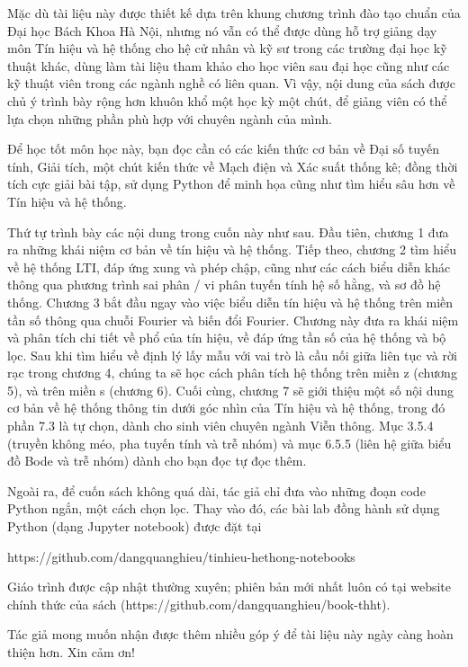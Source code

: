 \documentclass[
  10
]{article}
\begin{document}
Mặc dù tài liệu này được thiết kế dựa trên khung chương trình đào tạo
chuẩn của Đại học Bách Khoa Hà Nội, nhưng nó vẫn có thể được dùng hỗ trợ
giảng dạy môn Tín hiệu và hệ thống cho hệ cử nhân và kỹ sư trong các
trường đại học kỹ thuật khác, dùng làm tài liệu tham khảo cho học viên
sau đại học cũng như các kỹ thuật viên trong các ngành nghề có liên
quan. Vì vậy, nội dung của sách được chủ ý trình bày rộng hơn khuôn khổ
một học kỳ một chút, để giảng viên có thể lựa chọn những phần phù hợp
với chuyên ngành của mình.

Để học tốt môn học này, bạn đọc cần có các kiến thức cơ bản về Đại số
tuyến tính, Giải tích, một chút kiến thức về Mạch điện và Xác suất thống
kê; đồng thời tích cực giải bài tập, sử dụng Python để minh họa cũng như
tìm hiểu sâu hơn về Tín hiệu và hệ thống.

Thứ tự trình bày các nội dung trong cuốn này như sau. Đầu tiên, chương 1
đưa ra những khái niệm cơ bản về tín hiệu và hệ thống. Tiếp theo, chương
2 tìm hiểu về hệ thống LTI, đáp ứng xung và phép chập, cũng như các cách
biểu diễn khác thông qua phương trình sai phân / vi phân tuyến tính hệ
số hằng, và sơ đồ hệ thống. Chương 3 bắt đầu ngay vào việc biểu diễn tín
hiệu và hệ thống trên miền tần số thông qua chuỗi Fourier và biến đổi
Fourier. Chương này đưa ra khái niệm và phân tích chi tiết về phổ của
tín hiệu, về đáp ứng tần số của hệ thống và bộ lọc. Sau khi tìm hiểu về
định lý lấy mẫu với vai trò là cầu nối giữa liên tục và rời rạc trong
chương 4, chúng ta sẽ học cách phân tích hệ thống trên miền z (chương
5), và trên miền s (chương 6). Cuối cùng, chương 7 sẽ giới thiệu một số
nội dung cơ bản về hệ thống thông tin dưới góc nhìn của Tín hiệu và hệ
thống, trong đó phần 7.3 là tự chọn, dành cho sinh viên chuyên ngành
Viễn thông. Mục 3.5.4 (truyền không méo, pha tuyến tính và trễ nhóm) và
mục 6.5.5 (liên hệ giữa biểu đồ Bode và trễ nhóm) dành cho bạn đọc tự
đọc thêm.

Ngoài ra, để cuốn sách không quá dài, tác giả chỉ đưa vào những đoạn
code Python ngắn, một cách chọn lọc. Thay vào đó, các bài lab đồng hành
sử dụng Python (dạng Jupyter notebook) được đặt tại

https://github.com/dangquanghieu/tinhieu-hethong-notebooks

Giáo trình được cập nhật thường xuyên; phiên bản mới nhất luôn có tại
website chính thức của sách
(https://github.com/dangquanghieu/book-thht).

Tác giả mong muốn nhận được thêm nhiều góp ý để tài liệu này ngày càng
hoàn thiện hơn. Xin cảm ơn!
\end{document}

